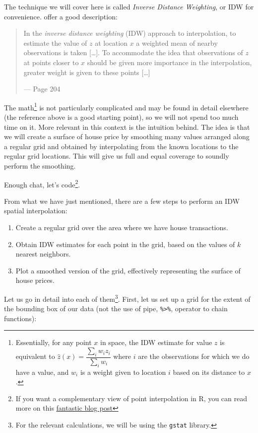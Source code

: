 \documentclass[
]{book}
\providecommand{\tightlist}{%
  \setlength{\itemsep}{0pt}\setlength{\parskip}{0pt}}
\begin{document}
The technique we will cover here is called \emph{Inverse Distance Weighting}, or IDW for convenience. \citet{comber2015} offer a good description:

\begin{quote}
In the \emph{inverse distance weighting} (IDW) approach to interpolation, to estimate the value of \(z\) at location \(x\) a weighted mean of nearby observations is taken {[}\ldots{]}. To accommodate the idea that observations of \(z\) at points closer to \(x\) should be given more importance in the interpolation, greater weight is given to these points {[}\ldots{]}

--- Page 204
\end{quote}

The math\footnote{Essentially, for any point \(x\) in space, the IDW estimate for value \(z\) is equivalent to \(\hat{z} (x) = \dfrac{\sum_i w_i z_i}{\sum_i w_i}\) where \(i\) are the observations for which we do have a value, and \(w_i\) is a weight given to location \(i\) based on its distance to \(x\).} is not particularly complicated and may be found in detail elsewhere (the reference above is a good starting point), so we will not spend too much time on it. More relevant in this context is the intuition behind. The idea is that we will create a surface of house price by smoothing many values arranged along a regular grid and obtained by interpolating from the known locations to the regular grid locations. This will give us full and equal coverage to soundly perform the smoothing.

Enough chat, let's code\footnote{If you want a complementary view of point interpolation in R, you can read more on this \href{https://swilke-geoscience.net/post/2020-09-10-kriging_with_r/kriging/}{fantastic blog post}}.

From what we have just mentioned, there are a few steps to perform an IDW spatial interpolation:

\begin{enumerate}
\def\labelenumi{\arabic{enumi}.}
\tightlist
\item
  Create a regular grid over the area where we have house transactions.
\item
  Obtain IDW estimates for each point in the grid, based on the values of \(k\) nearest neighbors.
\item
  Plot a smoothed version of the grid, effectively representing the surface of house prices.
\end{enumerate}

Let us go in detail into each of them\footnote{For the relevant calculations, we will be using the \texttt{gstat} library.}. First, let us set up a grid for the extent of the bounding box of our data (not the use of pipe, \texttt{\%\textgreater{}\%}, operator to chain functions):
\end{document}
